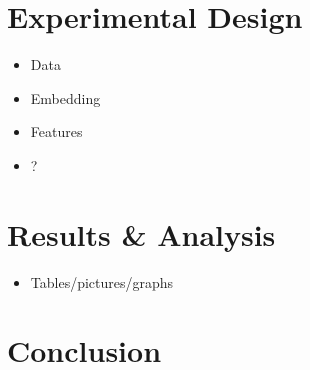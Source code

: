 \documentclass[11pt,a4paper,twoside,openright]{report}
\begin{document}
\chapter{Experimental Design}

\begin{itemize}
    \item Data
    \item Embedding
    \item Features
    \item ?
\end{itemize}

\chapter{Results \& Analysis}

\begin{itemize}
    \item Tables/pictures/graphs
\end{itemize}

\chapter{Conclusion}
\end{document}
